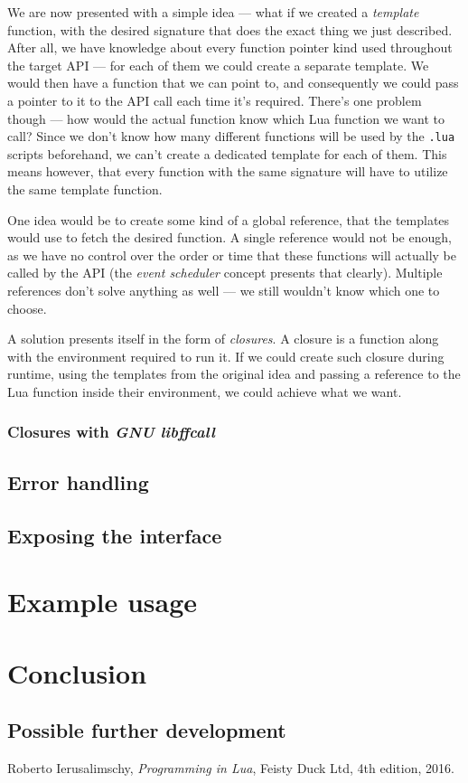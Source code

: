 \documentclass[polish, english]{iithesis}
\begin{document}
    We are now presented with a simple idea --- what if we created a \textit{template} function, with the desired signature that does the exact thing we just described.
    After all, we have knowledge about every function pointer kind used throughout the target API --- for each of them we could create a separate template.
    We would then have a function that we can point to, and consequently we could pass a pointer to it to the API call each time it's required.
    There's one problem though --- how would the actual function know which Lua function we want to call?
    Since we don't know how many different functions will be used by the \texttt{.lua} scripts beforehand, we can't create a dedicated template for each of them.
    This means however, that every function with the same signature will have to utilize the same template function.

    One idea would be to create some kind of a global reference, that the templates would use to fetch the desired function.
    A single reference would not be enough, as we have no control over the order or time that these functions will actually be called by the API (the \textit{event scheduler} concept presents that clearly).
    Multiple references don't solve anything as well --- we still wouldn't know which one to choose.

    A solution presents itself in the form of \textit{closures}.
    A closure is a function along with the environment required to run it.
    If we could create such closure during runtime, using the templates from the original idea and passing a reference to the Lua function inside their environment, we could achieve what we want.
    \subsection{Closures with \textit{GNU libffcall}}
  \section{Error handling}
  \section{Exposing the interface}
\chapter{Example usage}
\chapter{Conclusion}
  \section{Possible further development}

\begin{thebibliography}{42}
    Roberto Ierusalimschy,
    \emph{Programming in Lua},
    Feisty Duck Ltd,
    4th edition,
    2016.
\end{thebibliography}
\end{document}
